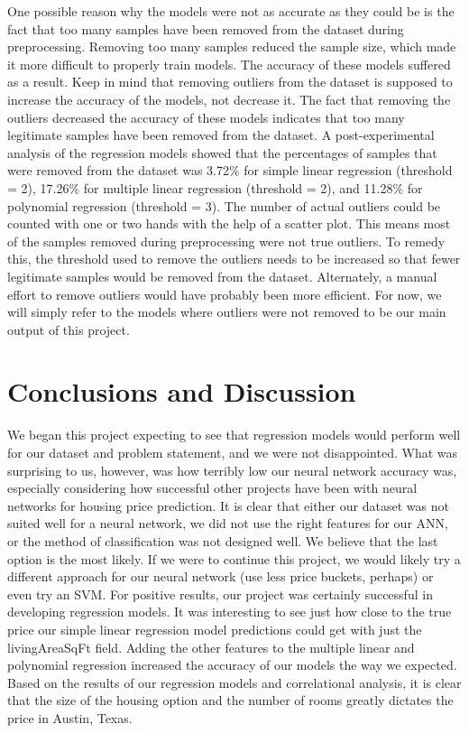 \documentclass[12pt]{article}
\begin{document}
	One possible reason why the models were not as accurate as they could be is the fact that too many samples have been removed from the dataset during preprocessing. Removing too many samples reduced the sample size, which made it more difficult to properly train models. The accuracy of these models suffered as a result. Keep in mind that removing outliers from the dataset is supposed to increase the accuracy of the models, not decrease it. The fact that removing the outliers decreased the accuracy of these models indicates that too many legitimate samples have been removed from the dataset. A post-experimental analysis of the regression models showed that the percentages of samples that were removed from the dataset was 3.72\% for simple linear regression (threshold = 2), 17.26\% for multiple linear regression (threshold = 2), and 11.28\% for polynomial regression (threshold = 3). The number of actual outliers could be counted with one or two hands with the help of a scatter plot. This means most of the samples removed during preprocessing were not true outliers. To remedy this, the threshold used to remove the outliers needs to be increased so that fewer legitimate samples would be removed from the dataset. Alternately, a manual effort to remove outliers would have probably been more efficient. For now, we will simply refer to the models where outliers were not removed to be our main output of this project. 
	
	\section{Conclusions and Discussion}
	
	We began this project expecting to see that regression models would perform well for our dataset and problem statement, and we were not disappointed. What was surprising to us, however, was how terribly low our neural network accuracy was, especially considering how successful other projects have been with neural networks for housing price prediction. It is clear that either our dataset was not suited well for a neural network, we did not use the right features for our ANN, or the method of classification was not designed well. We believe that the last option is the most likely. If we were to continue this project, we would likely try a different approach for our neural network (use less price buckets, perhaps) or even try an SVM. For positive results, our project was certainly successful in developing regression models. It was interesting to see just how close to the true price our simple linear regression model predictions could get with just the livingAreaSqFt field. Adding the other features to the multiple linear and polynomial regression increased the accuracy of our models the way we expected. Based on the results of our regression models and correlational analysis, it is clear that the size of the housing option and the number of rooms greatly dictates the price in Austin, Texas.
	
\end{document}
